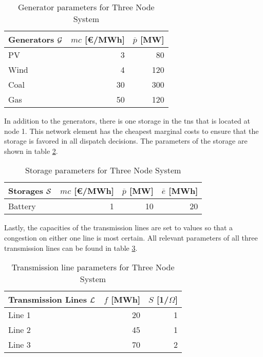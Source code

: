 \begin{table}[ht]
    \centering
    \begin{tabular}{lrr}
        Generators $\mathcal{G}$ & $mc$ [\euro/MWh] & $\overline{p}$ [MW] \\ \toprule
        PV & 3 & 80 \\
        Wind & 4 & 120 \\
        Coal & 30 & 300 \\
        Gas & 50 & 120 \\
        \bottomrule
    \end{tabular}
    \caption{Generator parameters for Three Node System} \label{tab:res:param-gen}
\end{table}

In addition to the generators, there is one storage in the \gls{tns} that is located at node 1. This network element has the cheapest marginal costs to ensure that the storage is favored in all dispatch decisions. The parameters of the storage are shown in table \ref{tab:res:param-stor}.

 \begin{table}[ht]
    \centering
    \begin{tabular}{lrrr}
        Storages $\mathcal{S}$ & $mc$ [\euro/MWh] & $\overline{p}$ [MW] & $\overline{e}$ [MWh] \\ \toprule
        Battery & 1 & 10 & 20 \\
        \bottomrule
    \end{tabular}
    \caption{Storage parameters for Three Node System} \label{tab:res:param-stor}
\end{table}

Lastly, the capacities of the transmission lines are set to values so that a congestion on either one line is most certain. All relevant parameters of all three transmission lines can be found in table \ref{tab:res:param-line}.

 \begin{table}[ht]
    \centering
    \begin{tabular}{lrr}
        Transmission Lines $\mathcal{L}$ & $f$ [MWh] & $S$ [1/$\Omega$] \\ \toprule
        Line 1 & 20 & 1 \\
        Line 2 & 45 & 1 \\
        Line 3 & 70 & 2 \\
        \bottomrule
    \end{tabular}
    \caption{Transmission line parameters for Three Node System} \label{tab:res:param-line}
\end{table}